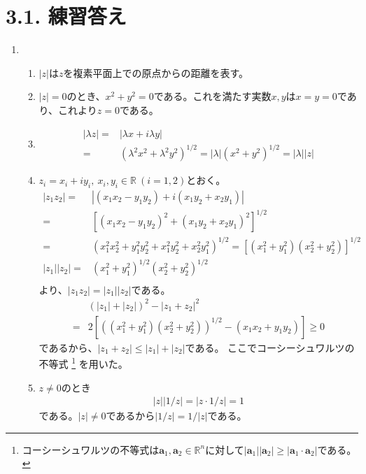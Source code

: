 \documentclass{jreport}
\begin{document}
\section*{3.1. 練習答え}
\begin{enumerate}[label=\textbf{\arabic*.}]
\item
\begin{enumerate}
\item $|z|$は$z$を複素平面上での原点からの距離を表す。
\item $|z|=0$のとき、$x^{2}+y^{2}=0$である。これを満たす実数$x,y$は$x=y=0$であり、これより$z=0$である。
\item \begin{align*}
|\lambda z|=&|\lambda x+i\lambda y|\\
=&(\lambda^{2}x^{2}+\lambda^{2}y^{2})^{1/2}
=|\lambda|(x^{2}+y^{2})^{1/2}=|\lambda||z|
\end{align*}
\item $z_{i}=x_{i}+iy_{i},\ x_{i},y_{i}\in\mathbb{R}\ (i=1,2)$とおく。
\begin{align*}
|z_{1}z_{2}|=&|(x_{1}x_{2}-y_{1}y_{2})+i(x_{1}y_{2}+x_{2}y_{1})|\\
=&[(x_{1}x_{2}-y_{1}y_{2})^{2}+(x_{1}y_{2}+x_{2}y_{1})^{2}]^{1/2}\\
=&(x_{1}^{2}x_{2}^{2}+y_{1}^{2}y_{2}^{2}+x_{1}^{2}y_{2}^{2}+x_{2}^{2}y_{1}^{2})^{1/2}
=[(x_{1}^{2}+y_{1}^{2})(x_{2}^{2}+y_{2}^{2})]^{1/2}\\
|z_{1}||z_{2}|=&(x_{1}^{2}+y_{1}^{2})^{1/2}(x_{2}^{2}+y_{2}^{2})^{1/2}\\
\end{align*}
より、$|z_{1}z_{2}|=|z_{1}||z_{2}|$である。
\begin{align*}
&(|z_{1}|+|z_{2}|)^{2}-|z_{1}+z_{2}|^{2}\\
=&2[((x_{1}^{2}+y_{1}^{2})(x_{2}^{2}+y_{2}^{2}))^{1/2}-(x_{1}x_{2}+y_{1}y_{2})]\geq0
\end{align*}
であるから、$|z_{1}+z_{2}|\leq|z_{1}|+|z_{2}|$である。
ここでコーシーシュワルツの不等式
\footnote{コーシーシュワルツの不等式は$\mathbf{a}_{1},\mathbf{a}_{2}\in\mathbb{R}^{n}$に対して$|\mathbf{a}_{1}||\mathbf{a}_{2}|\geq|\mathbf{a}_{1}\cdot\mathbf{a}_{2}|$である。}
を用いた。
\item $z\ne0$のとき
\begin{align*}
|z||1/z|=|z\cdot 1/z|=1
\end{align*}
である。$|z|\ne0$であるから$|1/z|=1/|z|$である。
\end{enumerate}
\end{enumerate}
\end{document}
